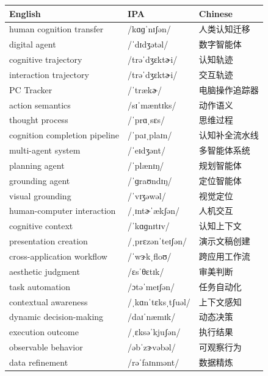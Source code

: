 \documentclass[UTF8,12pt,a4paper]{ctexart}
\providecommand{\zh}[1]{#1}
\begin{document}
\begin{tabular*}{\textwidth}{@{\extracolsep{\fill}}lll@{}}
\toprule
\textbf{English} & \textbf{IPA} & \textbf{Chinese} \\
\midrule
human cognition transfer & {\ipafont /kɑɡˈnɪʃən/} & \zh{人类认知迁移} \\
digital agent & {\ipafont /ˈdɪdʒətəl/} & \zh{数字智能体} \\
cognitive trajectory & {\ipafont /trəˈdʒɛktɚi/} & \zh{认知轨迹} \\
interaction trajectory & {\ipafont /trəˈdʒɛktɚi/} & \zh{交互轨迹} \\
PC Tracker & {\ipafont /ˈtrækɚ/} & \zh{电脑操作追踪器} \\
action semantics & {\ipafont /sɪˈmæntɪks/} & \zh{动作语义} \\
thought process & {\ipafont /ˈprɑˌsɛs/} & \zh{思维过程} \\
cognition completion pipeline & {\ipafont /ˈpaɪˌplaɪn/} & \zh{认知补全流水线} \\
multi-agent system & {\ipafont /ˈeɪdʒənt/} & \zh{多智能体系统} \\
planning agent & {\ipafont /ˈplænɪŋ/} & \zh{规划智能体} \\
grounding agent & {\ipafont /ˈɡraʊndɪŋ/} & \zh{定位智能体} \\
visual grounding & {\ipafont /ˈvɪʒəwəl/} & \zh{视觉定位} \\
human-computer interaction & {\ipafont /ˌɪntɚˈækʃən/} & \zh{人机交互} \\
cognitive context & {\ipafont /ˈkɑɡnɪtɪv/} & \zh{认知上下文} \\
presentation creation & {\ipafont /ˌprɛzənˈteɪʃən/} & \zh{演示文稿创建} \\
cross-application workflow & {\ipafont /ˈwɝkˌfloʊ/} & \zh{跨应用工作流} \\
aesthetic judgment & {\ipafont /ɛsˈθɛtɪk/} & \zh{审美判断} \\
task automation & {\ipafont /ɔtəˈmeɪʃən/} & \zh{任务自动化} \\
contextual awareness & {\ipafont /ˌkɑnˈtɛksˌtʃuəl/} & \zh{上下文感知} \\
dynamic decision-making & {\ipafont /daɪˈnæmɪk/} & \zh{动态决策} \\
execution outcome & {\ipafont /ˌɛksəˈkjuʃən/} & \zh{执行结果} \\
observable behavior & {\ipafont /əbˈzɝvəbəl/} & \zh{可观察行为} \\
data refinement & {\ipafont /rəˈfaɪnmənt/} & \zh{数据精炼} \\

\end{tabular*}
\end{document}
